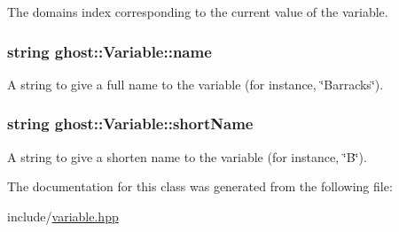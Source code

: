 The domain\textquotesingle{}s index corresponding to the current value of the variable. 

\subsubsection[{\texorpdfstring{name}{name}}]{\setlength{\rightskip}{0pt plus 5cm}string ghost\+::\+Variable\+::name\hspace{0.3cm}{\ttfamily [protected]}}\hypertarget{classghost_1_1Variable_a05cf4a4cd3a5c033028e0b0f11d1dafd}{}\label{classghost_1_1Variable_a05cf4a4cd3a5c033028e0b0f11d1dafd}


A string to give a full name to the variable (for instance, \char`\"{}\+Barracks\char`\"{}). 

\subsubsection[{\texorpdfstring{short\+Name}{shortName}}]{\setlength{\rightskip}{0pt plus 5cm}string ghost\+::\+Variable\+::short\+Name\hspace{0.3cm}{\ttfamily [protected]}}\hypertarget{classghost_1_1Variable_afb5eb79a7f6351b4305fe082699b6d7d}{}\label{classghost_1_1Variable_afb5eb79a7f6351b4305fe082699b6d7d}


A string to give a shorten name to the variable (for instance, \char`\"{}\+B\char`\"{}). 



The documentation for this class was generated from the following file\+:\begin{DoxyCompactItemize}
\item 
include/\hyperlink{variable_8hpp}{variable.\+hpp}\end{DoxyCompactItemize}
